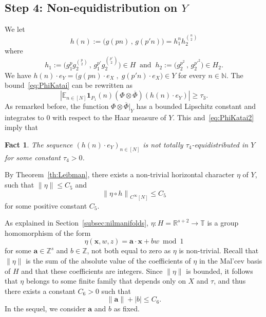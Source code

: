 \documentclass[11pt]{amsart}
\newtheorem{fact}{Fact}
\theoremstyle{definition}
\begin{document}
\subsection{Step 4: Non-equidistribution on $Y$}
 We let
$$
h(n):=\bigl(g(pn)\,,\,g(p'n)\bigr)= h_1^n h_2^{\binom n2}
$$
where
$$
h_1:=\bigl( g_1^pg_2^{\binom p2}\,,\, g_1^{p'}g_2^{\binom {p'}2}\bigr)\in H\ \text{ and }
\ h_2:=\bigl(g_2^{p^2}\,,\, g_2^{p'^2}\bigr)\in H_2.
$$
 We have   $h(n)\cdot e_Y=\bigl(g(pn)\cdot e_X\;,\;g(p'n)\cdot e_X\bigr)\in Y$ for every $n\in {{\mathbb N}}$. The bound~\eqref{eq:PhiKatai} can be rewritten as
\begin{equation}
\label{eq:PhiKatai2}
|{{\mathbb E}}_{n\in[N]} {\mathbf{1}}_{P_1}(n)
(\Phi\otimes\overline\Phi)(h(n)\cdot e_Y)|\geq\tau_3.
\end{equation}
As remarked before,   the function $\Phi\otimes\overline\Phi\vert_Y$
has a bounded Lipschitz constant and integrates to $0$  with respect to the Haar measure of $Y$.
This and~\eqref{eq:PhiKatai2} imply that
\begin{fact}
\label{fa:non-equi-Y}
The sequence $(h(n)\cdot e_Y)_{n\in[N]}$  is not totally $\tau_4$-equidistributed in  $Y$
for some constant $\tau_4>0$.
\end{fact}
By Theorem~\ref{th:Leibman}, there exists a non-trivial horizontal character $\eta$ of $Y$, such that ${\lVert \eta \rVert}\leq C_5$ and
\begin{equation}
\label{E:C_5}
 {\lVert {\eta\circ h} \rVert}_{C^\infty[N]}\leq C_5
\end{equation}
for some positive constant $C_5$.

As explained in Section~\ref{subsec:nilmanifolds}, $\eta\colon H={{\mathbb R}}^{s+2}\to{{\mathbb T}}$ is a group homomorphism of the form
\begin{equation}
\label{eq:defphixyy}
\eta({{\mathbf{x}}},w,z)={{\mathbf{a}}}\cdot{{\mathbf{x}}}+ bw\bmod 1
\end{equation}
for some ${{\mathbf{a}}}\in{{\mathbb Z}}^s$ and $b\in{{\mathbb Z}}$, not both equal to zero as $\eta$ is non-trivial. Recall that ${\lVert \eta \rVert}$ is the sum of the absolute value of the coefficients of $\eta$ in the Mal'cev basis of $H$ and that these coefficients are integers. Since ${\lVert \eta \rVert}$ is bounded, it follows that $\eta$ belongs to some finite family that depends only on $X$ and $\tau$, and thus there exists a constant $C_6>0$ such that
\begin{equation}
\label{E:C_5'}
{\lVert {{\mathbf{a}}} \rVert}+|b|\leq C_6.
\end{equation}
 In the sequel, we consider  ${{\mathbf{a}}}$ and $b$ as fixed.
\end{document}
